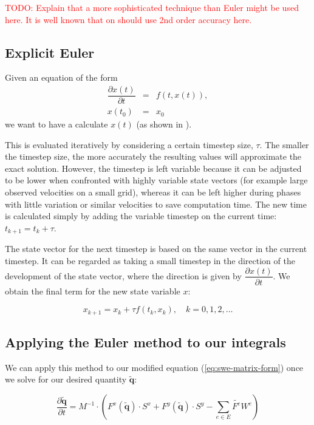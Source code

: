 \documentclass{article}
\newcommand{\todo}[1]{\textcolor{red}{TODO: #1}}
\newcommand{\pd}[2]{\dfrac{\partial #1}{\partial #2}}
\begin{document}
\todo{Explain that a more sophisticated technique than Euler might be used here. It is well known that on should use 2nd order accuracy here.}

\subsection{Explicit Euler}
\label{subsec:explicit-euler}

Given an equation of the form
\begin{eqnarray}
  \label{eq:euler-method-setting}
  \pd{x(t)}{t} & = & f(t, x(t)), \\
  x(t_0) & = & x_0
\end{eqnarray}
we want to have a calculate $x(t)$ (as shown in \cite{schwaiger08adaptive}).

This is evaluated iteratively by considering a certain timestep size, $\tau$. The smaller the timestep size, the more accurately the resulting values will approximate the exact solution. However, the timestep is left variable because it can be adjusted to be lower when confronted with highly variable state vectors (for example large observed velocities on a small grid), whereas it can be left higher during phases with little variation or similar velocities to save computation time. The new time is calculated simply by adding the variable timestep on the current time: $t_{k+1} = t_k + \tau$.

The state vector for the next timestep is based on the same vector in the current timestep. It can be regarded as taking a small timestep in the direction of the development of the state vector, where the direction is given by $\pd{x(t)}{t}$. We obtain the final term for the new state variable $x$:

\begin{equation}
  \label{eq:euler-step-solution}
  x_{k+1} = x_k + \tau f(t_k, x_k), \quad k=0,1,2,\dots
\end{equation}

\subsection{Applying the Euler method to our integrals}
\label{subsec:euler-method-applied}

We can apply this method to our modified equation (\ref{eq:swe-matrix-form}) once we solve for our desired quantity $\tilde{\mathbf{q}}$:

\begin{equation*}
  \pd{\tilde{\mathbf{q}}}{t} =
  M^{-1} \cdot \left(
    F^x(\tilde{\mathbf{q}}) \cdot S^x +
    F^y(\tilde{\mathbf{q}}) \cdot S^y -
    \sum_{e \in E} \tilde{F^e} W^e\right
  )
\end{equation*}
\end{document}
